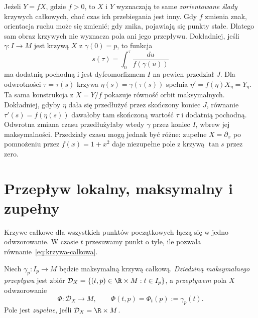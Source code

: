 \begin{przyklad}
Jeżeli $Y=fX$, gdzie $f>0$, to $X$ i $Y$ wyznaczają te same
\emph{zorientowane ślady} krzywych całkowych, choć czas ich
przebiegania jest inny. Gdy $f$ zmienia znak, orientacja ruchu może się
zmienić; gdy znika, pojawiają się punkty stałe. Dlatego sam obraz
krzywych nie wyznacza pola ani jego przepływu.
Dokładniej, jeśli $\gamma:I\to M$ jest krzywą $X$ z $\gamma(0)=p$,
to funkcja
\[
 s(\tau)=\int_0^\tau\frac{du}{f(\gamma(u))}
\]
ma dodatnią pochodną i jest dyfeomorfizmem $I$ na pewien
przedział $J$. Dla odwrotności $\tau=\tau(s)$ krzywa
$\eta(s)=\gamma(\tau(s))$ spełnia
$\eta'=f(\eta)X_\eta=Y_\eta$. Ta sama konstrukcja z $X=Y/f$
pokazuje równość orbit maksymalnych. Dokładniej, gdyby $\eta$
dała się przedłużyć przez skończony koniec $J$, równanie
$\tau'(s)=f(\eta(s))$ dawałoby tam skończoną wartość $\tau$
i dodatnią pochodną. Odwrotna zmiana czasu przedłużyłaby wtedy
$\gamma$ przez koniec $I$, wbrew jej maksymalności.
Przedziały czasu mogą
jednak być różne: zupełne $X=\partial_x$ po pomnożeniu przez
$f(x)=1+x^2$ daje niezupełne pole z krzywą $\tan s$ przez zero.
\end{przyklad}

\section{Przepływ lokalny, maksymalny i zupełny}
\label{sec:przeplyw}

Krzywe całkowe dla wszystkich punktów początkowych łączą się
w jedno odwzorowanie. W czasie $t$ przesuwamy punkt o tyle, ile
pozwala równanie~\eqref{eq:krzywa-calkowa}.

\begin{definicja}
Niech $\gamma_p\colon I_p\to M$ będzie maksymalną krzywą całkową.
\emph{Dziedziną maksymalnego przepływu} jest zbiór
$\mathcal D_X=\{(t,p)\in\R\times M:t\in I_p\}$, a
\emph{przepływem} pola $X$ odwzorowanie
\[
 \Phi\colon\mathcal D_X\to M,\qquad \Phi(t,p)=\Phi_t(p):=\gamma_p(t).
\]
Pole jest \emph{zupełne}, jeśli $\mathcal D_X=\R\times M$.
\end{definicja}

